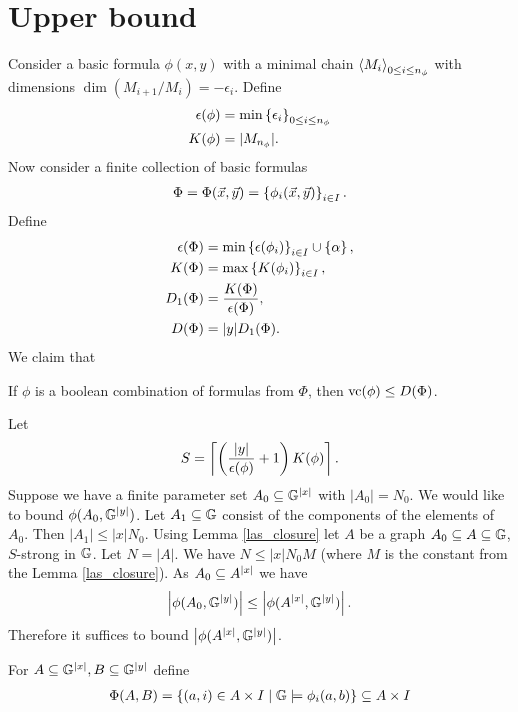 \documentclass{amsart}
\begin{document}
\section{Upper bound}
Consider a basic formula $\phi(x,y)$ with a minimal chain  $\left\langle M_i \right\rangle_{0 \leq i \leq n_{\phi}}$ with dimensions  $\dim(M_{i+1}/M_i) = -\epsilon_i$.
Define
\begin{align*}
  \epsilon(\phi) &= \min \left\{\epsilon_i\right\}_{0 \leq i \leq n_\phi}\\
  K(\phi) &= |M_{n_\phi}|.
\end{align*}
Now consider a finite collection of basic formulas
\begin{align*}
  \Phi = \Phi(\vec x, \vec y) = \left\{\phi_i(\vec x, \vec y)\right\}_{i\in I}.
\end{align*}
Define
\begin{align*}
  \epsilon(\Phi) &= \min \left\{\epsilon(\phi_i)\right\}_{i \in I} \cup \left\{\alpha\right\}, \\
  K(\Phi) &= \max \left\{K(\phi_i)\right\}_{i \in I},\\
  D_1(\Phi) &= \frac{K(\Phi)}{\epsilon(\Phi)}, \\
  D(\Phi) &= |y| D_1(\Phi).\\
\end{align*}
We claim that
\begin{Theorem} \label{upper}
  If $\phi$ is a boolean combination of formulas from $\Phi$, then $\operatorname{vc}(\phi) \leq D(\Phi)$.
\end{Theorem}
Let
\begin{align*}
  S = \left\lceil{\left(\frac{|y|}{\epsilon(\phi)} + 1\right) K(\phi)}\right\rceil.
\end{align*}
Suppose we have a finite parameter set $A_0 \subseteq \mathbb G^{|x|}$ with $|A_0| = N_0$.
We would like to bound $\phi(A_0, \mathbb G^{|y|})$.
Let $A_1 \subseteq \mathbb G$ consist of the components of the elements of $A_0$.
Then $|A_1| \leq |x| N_0$.
Using Lemma \ref{las_closure} let $A$ be a graph $A_0 \subseteq A \subseteq \mathbb G$, $S$-strong in $\mathbb G$.
Let $N = |A|$.
We have $N \leq |x| N_0 M$ (where $M$ is the constant from the Lemma \ref{las_closure}).
As $A_0 \subseteq A^{|x|}$ we have
\begin{align*}
  \left|\phi(A_0, \mathbb G^{|y|})\right| \leq \left|\phi(A^{|x|}, \mathbb G^{|y|})\right|.
\end{align*}
Therefore it suffices to bound $\left|\phi(A^{|x|}, \mathbb G^{|y|})\right|$.

\begin{Definition}
  For $A \subseteq \mathbb G^{|x|}, B \subseteq \mathbb G^{|y|}$ define
  \begin{align*}
    \Phi(A, B) = \left\{(a, i) \in A \times I \mid \mathbb G \models \phi_i(a, b)\right\} \subseteq A \times I
  \end{align*}  
\end{Definition}
\end{document}

